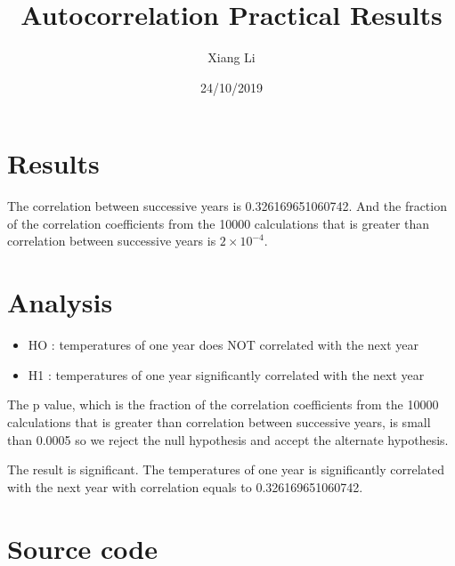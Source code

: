 \documentclass[12pt]{article}
\title{Autocorrelation Practical Results}
\author{Xiang Li}
\date{24/10/2019}
\begin{document}
	\maketitle
	
	
	\section{Results}
	The correlation between successive years is 0.326169651060742.
	And the fraction of the correlation coefficients from the 10000 calculations that is greater than correlation 
    between successive years is $2\times 10^{-4}$.
	
	\section{Analysis}
        \begin{itemize}
            \item HO : temperatures of one year does NOT correlated with the next year 
            \item H1 : temperatures of one year significantly correlated with the next year 
        \end{itemize}

	The p value, which is the fraction of the correlation coefficients from the 10000 calculations that is greater than correlation between successive years,
    is small than 0.0005 so we reject the null hypothesis and accept the alternate hypothesis.

    The result is significant. The temperatures of one year is significantly correlated with the next year with correlation equals to 0.326169651060742.

	\section{Source code}
	

\end{document}
